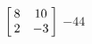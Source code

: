 {$\left[\hskip -3pt \begin{array}{cc} 8&10\\  2&-3\end {array} \hskip -3pt
 \right]$} 
{$-44$}



  

